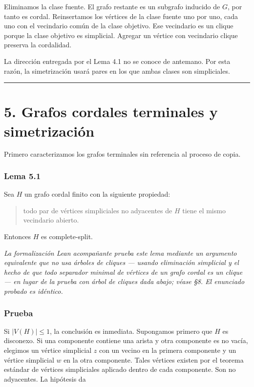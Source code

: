 \documentclass[
  11pt,
]{article}
\begin{document}
Eliminamos la clase fuente. El grafo restante es un subgrafo inducido de
\(G\), por tanto es cordal. Reinsertamos los vértices de la clase fuente
uno por uno, cada uno con el vecindario común de la clase objetivo. Ese
vecindario es un clique porque la clase objetivo es simplicial. Agregar
un vértice con vecindario clique preserva la cordalidad.

La dirección entregada por el Lema 4.1 no se conoce de antemano. Por
esta razón, la simetrización usará pares en los que ambas clases son
simpliciales.

\begin{center}\rule{0.5\linewidth}{0.5pt}\end{center}

\section{5. Grafos cordales terminales y
simetrización}\label{grafos-cordales-terminales-y-simetrizaciuxf3n}

Primero caracterizamos los grafos terminales sin referencia al proceso
de copia.

\subsubsection{Lema 5.1}\label{lema-5.1}

Sea \(H\) un grafo cordal finito con la siguiente propiedad:

\begin{quote}
todo par de vértices simpliciales no adyacentes de \(H\) tiene el mismo
vecindario abierto.
\end{quote}

Entonces \(H\) es complete-split.

\emph{La formalización Lean acompañante prueba este lema mediante un
argumento equivalente que no usa árboles de cliques --- usando
eliminación simplicial y el hecho de que todo separador minimal de
vértices de un grafo cordal es un clique --- en lugar de la prueba con
árbol de cliques dada abajo; véase §8. El enunciado probado es
idéntico.}

\subsubsection{Prueba}\label{prueba-5}

Si \(|V(H)|\le1\), la conclusión es inmediata. Supongamos primero que
\(H\) es disconexo. Si una componente contiene una arista y otra
componente es no vacía, elegimos un vértice simplicial \(z\) con un
vecino en la primera componente y un vértice simplicial \(w\) en la otra
componente. Tales vértices existen por el teorema estándar de vértices
simpliciales aplicado dentro de cada componente. Son no adyacentes. La
hipótesis da
\end{document}
